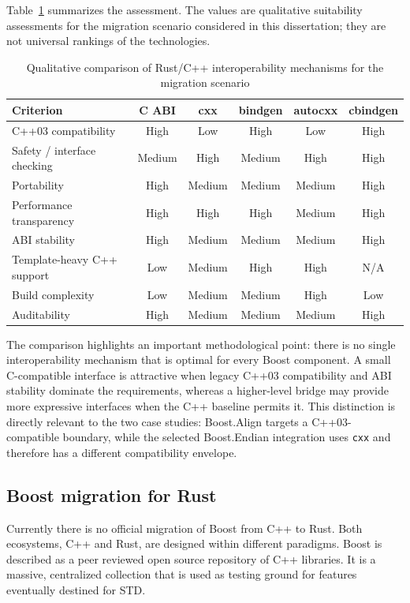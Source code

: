 Table~\ref{tab:ffi_mechanism_comparison} summarizes the assessment. The values are qualitative suitability assessments for the migration scenario considered in this dissertation; they are not universal rankings of the technologies.

\begin{table}[H]
\centering
\renewcommand{\arraystretch}{1.2}
{\small
\setlength{\tabcolsep}{4pt}
\begin{tabularx}{\textwidth}{|X|c|c|c|c|c|}
\hline
\textbf{Criterion} & \textbf{C ABI} & \textbf{cxx} & \textbf{bindgen} & \textbf{autocxx} & \textbf{cbindgen} \\ \hline
C++03 compatibility & High & Low & High & Low & High \\ \hline
Safety / interface checking & Medium & High & Medium & High & High \\ \hline
Portability & High & Medium & Medium & Medium & High \\ \hline
Performance transparency & High & High & High & Medium & High \\ \hline
ABI stability & High & Medium & Medium & Medium & High \\ \hline
Template-heavy C++ support & Low & Medium & High & High & N/A \\ \hline
Build complexity & Low & Medium & Medium & High & Low \\ \hline
Auditability & High & Medium & Medium & Medium & High \\ \hline
\end{tabularx}
}
\caption{Qualitative comparison of Rust/C++ interoperability mechanisms for the migration scenario}
\label{tab:ffi_mechanism_comparison}
\end{table}

The comparison highlights an important methodological point: there is no single interoperability mechanism that is optimal for every Boost component. A small C-compatible interface is attractive when legacy C++03 compatibility and ABI stability dominate the requirements, whereas a higher-level bridge may provide more expressive interfaces when the C++ baseline permits it. This distinction is directly relevant to the two case studies: Boost.Align targets a C++03-compatible boundary, while the selected Boost.Endian integration uses \texttt{cxx} and therefore has a different compatibility envelope.

\subsection{Boost migration for Rust}
Currently there is no official migration of Boost from C++ to Rust.
Both ecosystems, C++ and Rust, are designed within different paradigms. Boost is described as a peer reviewed open source
repository of C++ libraries. It is a massive, centralized collection that is used as testing ground for features eventually 
destined for \gls{STD}.

